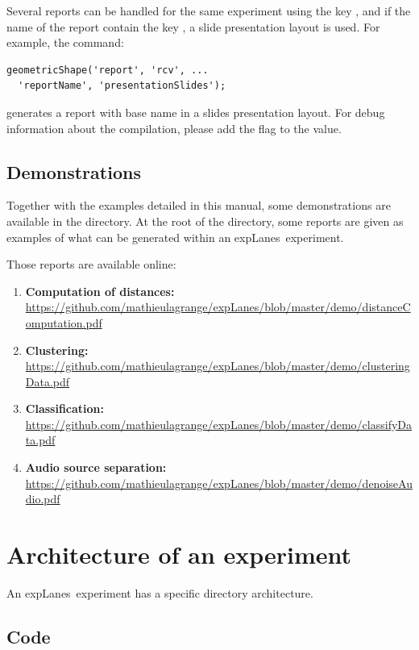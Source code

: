 \documentclass[a4paper,fleqn]{tufte-handout}
\newcommand{\explanes}{\textsf{expLanes}\ }
\begin{document}
Several reports can be handled for the same experiment using the key , and if the name of the report contain the key , a slide presentation layout is used. For example, the command:
\begin{lstlisting}
geometricShape('report', 'rcv', ...
  'reportName', 'presentationSlides');
\end{lstlisting} 
generates a report with base name  in a slides presentation layout. For debug information about the compilation, please add the  flag to the  value.

\subsection{Demonstrations}

Together with the examples detailed in this manual, some demonstrations are available in the  directory. At the root of the directory, some reports are given as examples of what can be generated within an \explanes experiment.

Those reports are available online:
\begin{enumerate}
\item \textbf{Computation of distances: }\url{https://github.com/mathieulagrange/expLanes/blob/master/demo/distanceComputation.pdf}
\item \textbf{Clustering: }\url{https://github.com/mathieulagrange/expLanes/blob/master/demo/clusteringData.pdf}
\item \textbf{Classification: }\url{https://github.com/mathieulagrange/expLanes/blob/master/demo/classifyData.pdf}
\item \textbf{Audio source separation: } \url{https://github.com/mathieulagrange/expLanes/blob/master/demo/denoiseAudio.pdf}
\end{enumerate}

\section{Architecture of an experiment}
\hypertarget{architecture}{}
 
An \explanes experiment has a specific directory architecture. 

\subsection{Code}
\end{document}
